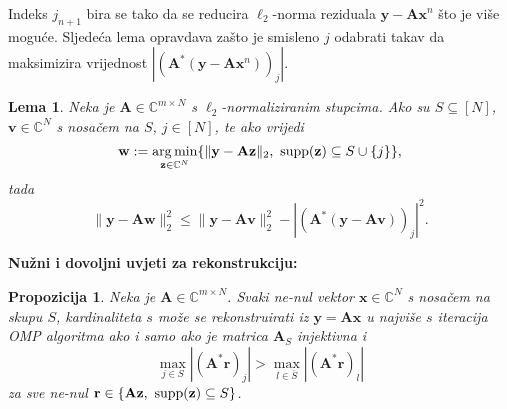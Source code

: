 \documentclass{beamer}
\newtheorem{lem}[thm]{Lema}
\newtheorem{prop}[thm]{Propozicija}
\newcommand{\C}{\mathbb{C}}
\newcommand{\vect}[1]{\mathbf{#1}}
\renewcommand{\vec}{\vect}
\newcommand{\supp}{\text{\normalfont{supp}}}
\newcommand{\norm}[1]{\|{#1}\|}
\DeclareMathOperator*{\argmin}{arg\,min}
\begin{document}
\begin{frame}
Indeks $j_{n+1}$ bira se tako da se reducira $\ell_2$-norma reziduala $\vec{y} - \vec{Ax}^n$ \v{s}to je vi\v{s}e mogu\'ce. Sljede\'ca lema opravdava za\v{s}to je smisleno $j$ odabrati takav da maksimizira vrijednost $|{(\vec{A}^*(\vec{y}-\vec A \vec x^n))_j}|$.
\begin{lem}
    Neka je $\vec A \in \C^{m \times N}$ s $\ell_2$-normaliziranim stupcima. Ako su $S \subseteq [N]$, $\vec v \in \C^N$ s nosa\v{c}em na $S$, $j \in [N]$, te ako vrijedi
    \begin{equation*}
        \vec w := \argmin_{\vec z \in \C^N} \{ \norm{\vec y - \vec{Az}}_2,\ \supp(\vec z) \subseteq S \cup \{j\} \},
    \end{equation*}
    tada
    \begin{equation*}
        \norm{\vec y - \vec{Aw}}_2^2 \leq \norm{\vec y - \vec{Av}}_2^2 - |(\vec{A}^*(\vec y - \vec{Av}))_j|^2.
    \end{equation*}
\end{lem}

\end{frame}

\begin{frame}
    \textbf{Nu\v{z}ni i dovoljni uvjeti za rekonstrukciju:}
\begin{prop}\label{prop:3:5}
    Neka je $\vec A \in \C^{m \times N}$. Svaki ne-nul vektor $\vec x \in \C^N$ s nosa\v{c}em na skupu $S$, kardinaliteta $s$ mo\v{z}e se rekonstruirati iz $\vec y = \vec{Ax}$ u najvi\v{s}e $s$ iteracija OMP algoritma ako i samo ako je matrica $\vec A_S$ injektivna i 
    \begin{equation}\label{uvjet_rekon_omp}
        \max_{j \in S}|(\vec A^* \vec r)_j| > \max_{l \in \bar{S}}|(\vec A^* \vec r)_l|
    \end{equation}
    za sve ne-nul $\vec r \in \{\vec{Az},\ \supp(\vec z) \subseteq S\}$.
\end{prop}
\end{frame}
\end{document}
